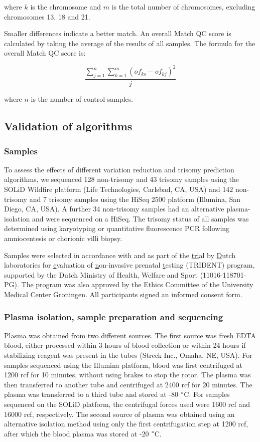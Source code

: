 \noindent where $k$ is the chromosome and $m$ is the total number of chromosomes, excluding chromosomes 13, 18 and 21.

Smaller differences indicate a better match. 
An overall Match QC score is calculated by taking the average of the results of all samples. The formula for the overall Match QC score is:

\begin{equation*}
	\frac{\sum^n_{j=1}\sum^m_{k=1}(of_{ks} - of_{kj})^2}{j}
\end{equation*}

\noindent where $n$ is the number of control samples.

\subsection{Validation of algorithms}
\subsubsection{Samples}
To assess the effects of different variation reduction and trisomy prediction algorithms, we sequenced 128 non-trisomy and 43 trisomy samples using the SOLiD Wildfire platform (Life Technologies, Carlsbad, CA, USA) and 142 non-trisomy and 7 trisomy samples using the HiSeq 2500 platform (Illumina, San Diego, CA, USA). 
A further 34 non-trisomy samples had an alternative plasma-isolation and were sequenced on a HiSeq. 
The trisomy status of all samples was determined using karyotyping or quantitative fluorescence PCR following amniocentesis or chorionic villi biopsy.

Samples were selected in accordance with and as part of the \underline{tri}al by \underline{D}utch laboratories for \underline{e}valuation of \underline{n}on-invasive prenatal \underline{t}esting (TRIDENT) program, supported by the Dutch Ministry of Health, Welfare and Sport (11016-118701-PG). 
The program was also approved by the Ethics Committee of the University Medical Center Groningen. 
All participants signed an informed consent form.

\subsubsection{Plasma isolation, sample preparation and sequencing}
Plasma was obtained from two different sources. 
The first source was fresh EDTA blood, either processed within 3 hours of blood collection or within 24 hours if stabilizing reagent was present in the tubes (Streck Inc., Omaha, NE, USA). 
For samples sequenced using the Illumina platform, blood was first centrifuged at 1200 rcf for 10 minutes, without using brakes to stop the rotor. 
The plasma was then transferred to another tube and centrifuged at 2400 rcf for 20 minutes. The plasma was transferred to a third tube and stored at -80 $\degree$C. 
For samples sequenced on the SOLiD platform, the centrifugal forces used were 1600 rcf and 16000 rcf, respectively. 
The second source of plasma was obtained using an alternative isolation method using only the first centrifugation step at 1200 rcf, after which the blood plasma was stored at -20 $\degree$C.

